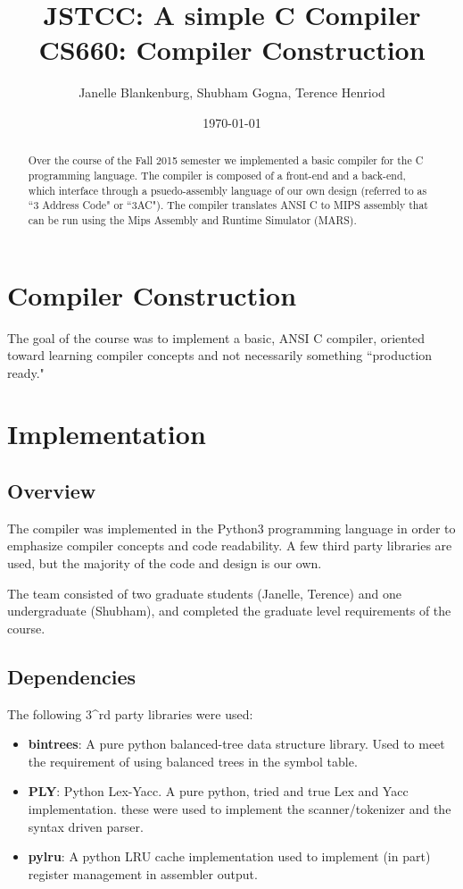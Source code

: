 \documentclass{article}
\title{JSTCC: A simple C Compiler \\ CS660: Compiler Construction}
\author{Janelle Blankenburg, Shubham Gogna, Terence Henriod}
\date{\today}
\begin{document}
\clearpage            %
\maketitle            %
\thispagestyle{empty} %

\begin{abstract}
\noindent Over the course of the Fall 2015 semester we implemented a basic
compiler for the C programming language. The compiler is composed of a front-end
and a back-end, which interface through a psuedo-assembly language of our own
design (referred to as ``3 Address Code" or ``3AC"). The compiler translates
ANSI C to MIPS assembly that can be run using the Mips Assembly and Runtime 
Simulator (MARS).
\end{abstract}

\newpage
\section{Compiler Construction}
The goal of the course was to implement a basic, ANSI C compiler, oriented
toward learning compiler concepts and not necessarily something ``production
ready."




\section{Implementation}
\subsection{Overview}
The compiler was implemented in the Python3 programming language in order to
emphasize compiler concepts and code readability. A few third party libraries
are used, but the majority of the code and design is our own.

The team consisted of two graduate students (Janelle, Terence) and one
undergraduate (Shubham), and completed the graduate level requirements of the
course.

\subsection{Dependencies}
The following 3^{rd} party libraries were used:
  \begin{itemize}
  \item \textbf{bintrees}: A pure python balanced-tree data structure library.
                            Used to meet the requirement of using balanced
                            trees in the symbol table.

  \item \textbf{PLY}: Python Lex-Yacc. A pure python, tried and true Lex and 
                      Yacc implementation. these were used to implement the
                      scanner/tokenizer and the syntax driven parser.

  \item \textbf{pylru}: A python LRU cache implementation used to implement (in
                        part) register management in assembler output.
  \end{itemize}
\end{document}
